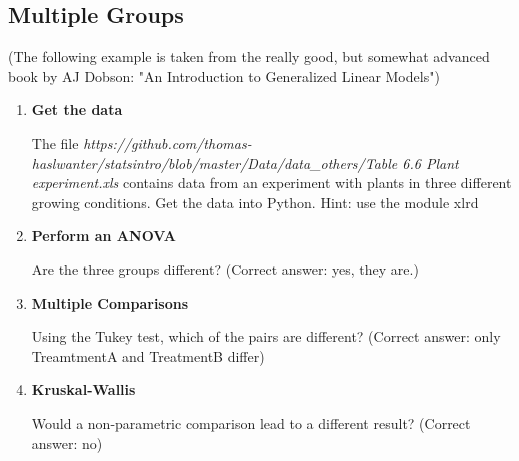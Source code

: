 \subsection*{Multiple Groups}

(The following example is taken from the really good, but somewhat advanced book by AJ Dobson: "An Introduction to Generalized Linear Models")

\begin{enumerate}
  \item \textbf{Get the data}

    The file   \emph{https://github.com/thomas-haslwanter/statsintro/blob/master/Data/data\_others/Table 6.6 Plant experiment.xls} contains data from an experiment with plants in three different growing conditions. Get the data into Python.
    Hint: use the module xlrd

  \item \textbf{Perform an ANOVA}

    Are the three groups different?
    (Correct answer: yes, they are.)

  \item \textbf{Multiple Comparisons}

    Using the Tukey test, which of the pairs are different?
    (Correct answer: only TreamtmentA and TreatmentB differ)

  \item \textbf{Kruskal-Wallis}

    Would a non-parametric comparison lead to a different result?
    (Correct answer: no)

\end{enumerate}
